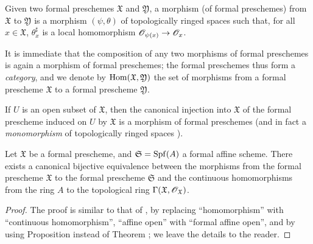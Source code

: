 \begin{definition}[10.4.5]
\label{1.10.4.5}
Given two formal preschemes $\mathfrak{X}$ and $\mathfrak{Y}$, a morphism (of formal preschemes) from $\mathfrak{X}$ to $\mathfrak{Y}$ is a morphism $(\psi,\theta)$ of topologically ringed spaces such that, for all $x\in\mathfrak{X}$, $\theta_x^\sharp$ is a local homomorphism $\sh{O}_{\psi(x)}\to\sh{O}_x$.
\end{definition}

It is immediate that the composition of any two morphisms of formal preschemes is again a morphism of formal preschemes; the formal preschemes thus form a \emph{category}, and we denote by $\operatorname{Hom}(\mathfrak{X},\mathfrak{Y})$ the set of morphisms from a formal prescheme $\mathfrak{X}$ to a formal prescheme $\mathfrak{Y}$.

If $U$ is an open subset of $\mathfrak{X}$, then the canonical injection into $\mathfrak{X}$ of the formal prescheme induced on $U$ by $\mathfrak{X}$ is a morphism of formal preschemes (and in fact a \emph{monomorphism} of topologically ringed spaces ).

\begin{proposition}[10.4.6]
\label{1.10.4.6}
Let $\mathfrak{X}$ be a formal prescheme, and $\mathfrak{S}=\operatorname{Spf}(A)$ a formal affine scheme.
There exists a canonical bijective equivalence between the morphisms from the formal prescheme $\mathfrak{X}$ to the formal prescheme $\mathfrak{S}$ and the continuous homomorphisms from the ring $A$ to the topological ring $\Gamma(\mathfrak{X},\mathscr{O}_\mathfrak{X})$.
\end{proposition}

\begin{proof}
\label{proof-1.10.4.6}
The proof is similar to that of , by replacing ``homomorphism'' with ``continuous homomorphism'', ``affine open'' with ``formal affine open'', and by using Proposition  instead of Theorem ; we leave the details to the reader.
\end{proof}

